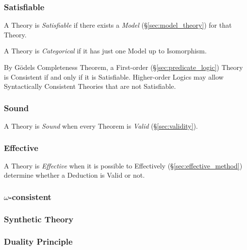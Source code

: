 \subsubsection{Satisfiable}\label{sec:satisfiable_theory}

A Theory is \emph{Satisfiable} if there exists a \emph{Model}
(\S\ref{sec:model_theory}) for that Theory.

A Theory is \emph{Categorical} if it has just one Model up to
Isomorphism.


By G\"odels Completeness Theorem, a First-order
(\S\ref{sec:predicate_logic}) Theory is Consistent if and only if it
is Satisfiable. Higher-order Logics may allow Syntactically Consistent
Theories that are not Satisfiable.



\subsubsection{Sound}\label{sec:sound_theory}

A Theory is \emph{Sound} when every Theorem is \emph{Valid}
(\S\ref{sec:validity}).



\subsubsection{Effective}\label{sec:effective_theory}

A Theory is \emph{Effective} when it is possible to Effectively
(\S\ref{sec:effective_method}) determine whether a Deduction is Valid
or not.



\subsubsection{$\omega$-consistent}\label{sec:omega_consistent}

\subsubsection{Synthetic Theory}\label{sec:synthetic_theory}

\subsubsection{Duality Principle}\label{sec:duality_principle}



